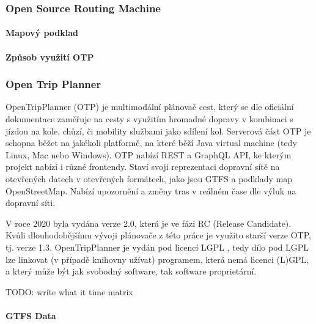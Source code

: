 \documentclass[thesis=M,czech]{FITthesis}[2019/12/23]
\theoremstyle{plain}
\theoremstyle{definition}
\begin{document}
\subsubsection{Open Source Routing Machine}



\paragraph{Mapový podklad}



\paragraph{Způsob využití OTP}


\subsubsection{Open Trip Planner}
OpenTripPlanner (OTP)\cite{otp-site} je multimodální plánovač cest, který se dle oficiální dokumentace zaměřuje na cesty s využitím hromadné dopravy v kombinaci s jízdou na kole, chůzí, či mobility službami jako sdílení kol. Serverová část OTP je schopna běžet na jakékoli platformě, na které běží Java virtual machine (tedy Linux, Mac nebo Windows). OTP nabízí REST a GraphQL API, ke kterým projekt nabízí i různé frontendy. Staví svoji reprezentaci dopravní sítě na otevřených datech v otevřených formátech, jako jsou GTFS a podklady map OpenStreetMap. Nabízí upozornění a změny tras v reálném čase dle výluk na dopravní síti.

V roce 2020 byla vydána verze 2.0, která je ve fázi RC (Release Candidate). Kvůli dlouhodobějšímu vývoji plánovače z této práce je využito starší verze OTP, tj. verze 1.3. OpenTripPlanner je vydán pod licencí LGPL \cite{lgpl}, tedy dílo pod LGPL lze linkovat (v případě knihovny užívat) programem, která nemá licenci (L)GPL, a který může být jak svobodný software, tak software proprietární.\cite{lgpl-stallman}



TODO: write what it time matrix

\paragraph{GTFS Data}
\end{document}
